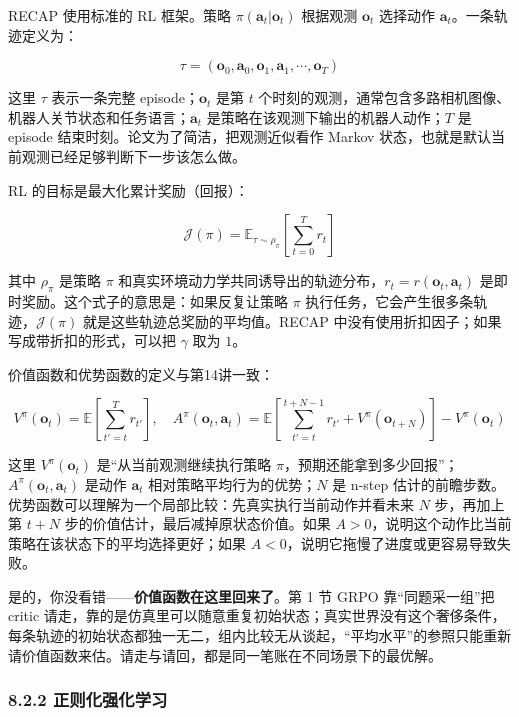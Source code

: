\documentclass[
  chinese,
]{ctexart}
\begin{document}
RECAP 使用标准的 RL 框架。策略 \(\pi(\mathbf{a}_t | \mathbf{o}_t)\)
根据观测 \(\mathbf{o}_t\) 选择动作 \(\mathbf{a}_t\)。一条轨迹定义为：

\[
\tau = (\mathbf{o}_0, \mathbf{a}_0, \mathbf{o}_1, \mathbf{a}_1, \cdots, \mathbf{o}_T)
\]

这里 \(\tau\) 表示一条完整 episode；\(\mathbf{o}_t\) 是第 \(t\)
个时刻的观测，通常包含多路相机图像、机器人关节状态和任务语言；\(\mathbf{a}_t\)
是策略在该观测下输出的机器人动作；\(T\) 是 episode
结束时刻。论文为了简洁，把观测近似看作 Markov
状态，也就是默认当前观测已经足够判断下一步该怎么做。

RL 的目标是最大化累计奖励（回报）：

\[
\mathcal{J}(\pi) = \mathbb{E}_{\tau \sim \rho_\pi}\left[\sum_{t=0}^T r_t\right]
\]

其中 \(\rho_\pi\) 是策略 \(\pi\)
和真实环境动力学共同诱导出的轨迹分布，\(r_t = r(\mathbf{o}_t, \mathbf{a}_t)\)
是即时奖励。这个式子的意思是：如果反复让策略 \(\pi\)
执行任务，它会产生很多条轨迹，\(\mathcal{J}(\pi)\)
就是这些轨迹总奖励的平均值。RECAP
中没有使用折扣因子；如果写成带折扣的形式，可以把 \(\gamma\) 取为 \(1\)。

价值函数和优势函数的定义与第14讲一致：

\[
V^\pi(\mathbf{o}_t) = \mathbb{E}\left[\sum_{t'=t}^T r_{t'}\right], \quad A^\pi(\mathbf{o}_t, \mathbf{a}_t) = \mathbb{E}\left[\sum_{t'=t}^{t+N-1} r_{t'} + V^\pi(\mathbf{o}_{t+N})\right] - V^\pi(\mathbf{o}_t)
\]

这里 \(V^\pi(\mathbf{o}_t)\) 是``从当前观测继续执行策略
\(\pi\)，预期还能拿到多少回报''；\(A^\pi(\mathbf{o}_t,\mathbf{a}_t)\)
是动作 \(\mathbf{a}_t\) 相对策略平均行为的优势；\(N\) 是 n-step
估计的前瞻步数。优势函数可以理解为一个局部比较：先真实执行当前动作并看未来
\(N\) 步，再加上第 \(t+N\) 步的价值估计，最后减掉原状态价值。如果
\(A>0\)，说明这个动作比当前策略在该状态下的平均选择更好；如果
\(A<0\)，说明它拖慢了进度或更容易导致失败。

是的，你没看错------\textbf{价值函数在这里回来了}。第 1 节 GRPO
靠``同题采一组''把 critic
请走，靠的是仿真里可以随意重复初始状态；真实世界没有这个奢侈条件，每条轨迹的初始状态都独一无二，组内比较无从谈起，``平均水平''的参照只能重新请价值函数来估。请走与请回，都是同一笔账在不同场景下的最优解。

\subsubsection{8.2.2
正则化强化学习}\label{ux6b63ux5219ux5316ux5f3aux5316ux5b66ux4e60}
\end{document}
